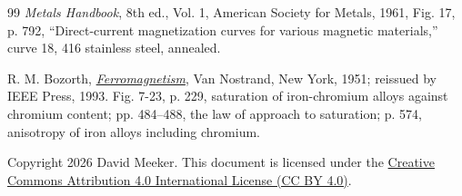 \documentclass[
  11pt,
]{article}
\begin{document}
\begin{thebibliography}{99}
 \emph{Metals Handbook}, 8th ed., Vol. 1, American Society for Metals, 1961, Fig. 17, p. 792, ``Direct-current magnetization curves for various magnetic materials,'' curve 18, 416 stainless steel, annealed.

 R. M. Bozorth, \href{https://doi.org/10.1109/9780470544624}{\emph{Ferromagnetism}}, Van Nostrand, New York, 1951; reissued by IEEE Press, 1993. Fig. 7-23, p. 229, saturation of iron-chromium alloys against chromium content; pp. 484--488, the law of approach to saturation; p. 574, anisotropy of iron alloys including chromium.

\end{thebibliography}

\noindent Copyright 2026 David Meeker. This document is licensed under the \href{https://creativecommons.org/licenses/by/4.0/}{Creative Commons Attribution 4.0 International License (CC BY 4.0)}.
\end{document}
